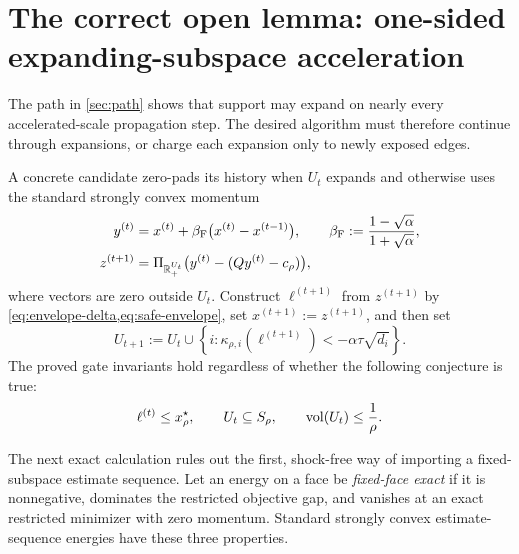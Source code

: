 \section{The correct open lemma: one-sided expanding-subspace acceleration}
\label{sec:open-lemma}

The path in \cref{sec:path} shows that support may expand on nearly every
accelerated-scale propagation step.  The desired algorithm must therefore
continue through expansions, or charge each expansion only to newly exposed
edges.

A concrete candidate zero-pads its history when $U_t$ expands and otherwise
uses the standard strongly convex momentum
\begin{align}
 y^{(t)}
 &=x^{(t)}+\beta_{\mathrm F}\bigl(x^{(t)}-x^{(t-1)}\bigr),
 \qquad
 \beta_{\mathrm F}:=\frac{1-\sqrt\alpha}{1+\sqrt\alpha},
 \label{eq:dynamic-y}\\
 z^{(t+1)}
 &=\Pi_{\mathbb{R}_+^{U_t}}
   \bigl(y^{(t)}-(Qy^{(t)}-c_\rho)\bigr),
 \label{eq:dynamic-step}
\end{align}
where vectors are zero outside $U_t$.  Construct $\ell^{(t+1)}$ from
$z^{(t+1)}$ by \cref{eq:envelope-delta,eq:safe-envelope}, set
$x^{(t+1)}:=z^{(t+1)}$, and then set
\begin{equation}
 U_{t+1}:=U_t\cup
 \left\{i:
 \kappa_{\rho,i}(\ell^{(t+1)})
 <-\alpha\tau\sqrt{d_i}
 \right\}.
 \label{eq:dynamic-gate}
\end{equation}
The proved gate invariants hold regardless of whether the following
conjecture is true:
\begin{equation}
 \ell^{(t)}\leq x_\rho^\star,
 \qquad
 U_t\subseteq S_\rho,
 \qquad
 \operatorname{vol}(U_t)\leq\frac1\rho.
 \label{eq:dynamic-invariants}
\end{equation}

The next exact calculation rules out the first, shock-free way of importing a
fixed-subspace estimate sequence.  Let an energy on a face be
\emph{fixed-face exact} if it is nonnegative, dominates the restricted
objective gap, and vanishes at an exact restricted minimizer with zero
momentum.  Standard strongly convex estimate-sequence energies have these
three properties.

